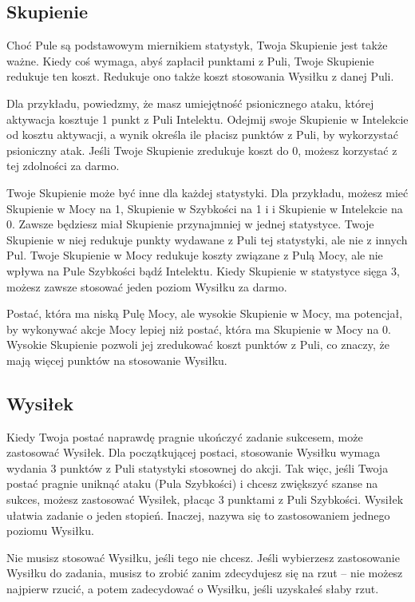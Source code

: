 \subsection{Skupienie}

Choć Pule są podstawowym miernikiem statystyk, Twoja Skupienie jest także ważne. Kiedy coś wymaga, abyś zapłacił punktami z Puli, Twoje Skupienie redukuje ten koszt. Redukuje ono także koszt stosowania Wysiłku z danej Puli.

Dla przykładu, powiedzmy, że masz umiejętność psionicznego ataku, której aktywacja kosztuje 1 punkt z Puli Intelektu. Odejmij swoje Skupienie w Intelekcie od kosztu aktywacji, a wynik określa ile płacisz punktów z Puli, by wykorzystać psioniczny atak. Jeśli Twoje Skupienie zredukuje koszt do 0, możesz korzystać z tej zdolności za darmo.

Twoje Skupienie może być inne dla każdej statystyki. Dla przykładu, możesz mieć Skupienie w Mocy na 1, Skupienie w Szybkości na 1 i i Skupienie w Intelekcie na 0. Zawsze będziesz miał Skupienie przynajmniej w jednej statystyce. Twoje Skupienie w niej redukuje punkty wydawane z Puli tej statystyki, ale nie z innych Pul. Twoje Skupienie w Mocy redukuje koszty związane z Pulą Mocy, ale nie wpływa na Pule Szybkości bądź Intelektu. Kiedy Skupienie w statystyce sięga 3, możesz zawsze stosować jeden poziom Wysiłku za darmo.

Postać, która ma niską Pulę Mocy, ale wysokie Skupienie w Mocy, ma potencjał, by wykonywać akcje Mocy lepiej niż postać, która ma Skupienie w Mocy na 0. Wysokie Skupienie pozwoli jej zredukować koszt punktów z Puli, co znaczy, że mają więcej punktów na stosowanie Wysiłku.

\subsection{Wysiłek}

Kiedy Twoja postać naprawdę pragnie ukończyć zadanie sukcesem, może zastosować Wysiłek. Dla początkującej postaci, stosowanie Wysiłku wymaga wydania 3 punktów z Puli statystyki stosownej do akcji. Tak więc, jeśli Twoja postać pragnie uniknąć ataku (Pula Szybkości) i chcesz zwiększyć szanse na sukces, możesz zastosować Wysiłek, płacąc 3 punktami z Puli Szybkości. Wysiłek ułatwia zadanie o jeden stopień. Inaczej, nazywa się to zastosowaniem jednego poziomu Wysiłku.

Nie musisz stosować Wysiłku, jeśli tego nie chcesz. Jeśli wybierzesz zastosowanie Wysiłku do zadania, musisz to zrobić zanim zdecydujesz się na rzut – nie możesz najpierw rzucić, a potem zadecydować o Wysiłku, jeśli uzyskałeś słaby rzut. 

